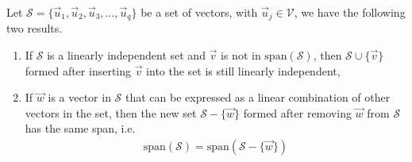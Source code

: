 \begin{thm}
\label{thm:plusminus}
Let $\mathcal{S} = \{\vec{u}_1, \vec{u}_2, \vec{u}_3, \ldots, \vec{u}_q\}$ be a set of vectors, with $\vec{u}_j \in \mathcal{V}$, we have the following two results.
\begin{enumerate}[label=(\alph*)]
    \item If $\mathcal{S}$ is a linearly independent set and $\vec{v}$ is not in $\text{span}(\mathcal{S})$, then $\mathcal{S} \cup \{\vec{v}\}$ formed after inserting $\vec{v}$ into the set is still linearly independent,
    \item If $\vec{w}$ is a vector in $\mathcal{S}$ that can be expressed as a linear combination of other vectors in the set, then the new set $\mathcal{S} - \{\vec{w}\}$ formed after removing $\vec{w}$ from $\mathcal{S}$ has the same span, i.e.
    \begin{align*}
    \text{span}(\mathcal{S}) = \text{span}(\mathcal{S} - \{\vec{w}\})
    \end{align*}
\end{enumerate}
\end{thm}
